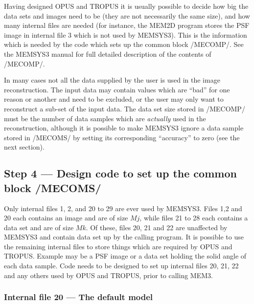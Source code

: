 Having designed OPUS and TROPUS it is usually possible to decide how big the
data sets and images need to be (they are not necessarily the same size),
and how many internal files are needed (for instance, the MEM2D program stores
the PSF image in internal file 3 which is not used by MEMSYS3).
This is the information which is needed by the code which sets up the common
block /MECOMP/. See the MEMSYS3 manual for full detailed description of the
contents of /MECOMP/.


In many cases not all the data supplied by the user is used in the image
reconstruction. The input data may contain values which are ``bad'' for one
reason or another and need to be excluded, or the user may only want to
reconstruct a sub-set of the input data. The data set size stored in /MECOMP/
must be the number of data samples which are {\em actually} used in the
reconstruction, although it is possible to make MEMSYS3 ignore a data sample
stored in /MECOMS/ by setting its corresponding ``accuracy'' to zero (see the
next section).

\subsection {Step 4 --- Design code to set up the common block /MECOMS/}

Only internal files 1, 2, and 20 to 29 are ever used by MEMSYS3. Files 1,2
and 20 each contains an image and are of size $Mj$, while files 21 to 28 each
contains a data set and are of size $Mk$. Of these, files 20, 21 and 22 are
unaffected by MEMSYS3 and contain data set up by the calling program. It is
possible to use the remaining internal files to store things which are required
by OPUS and TROPUS. Example may be a PSF image or a data set holding the solid
angle of each data sample. Code needs to be designed to set up internal
files 20, 21, 22 and any others used by OPUS and TROPUS, prior to calling MEM3.

\subsubsection {Internal file 20 --- The default model}

